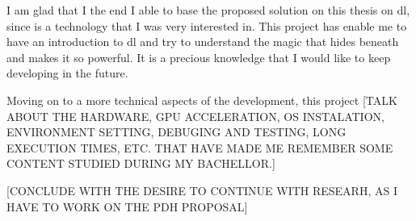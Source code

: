 I am glad that I the end I able to base the proposed solution on this thesis on \acrshort{dl}, since is a technology that I was very interested in. This project has enable me to have an introduction to \acrshort{dl} and try to understand the magic that hides beneath and makes it so powerful. It is a precious knowledge that I would like to keep developing in the future.

Moving on to a more technical aspects of the development, this project [TALK ABOUT THE HARDWARE, GPU ACCELERATION, OS INSTALATION, ENVIRONMENT SETTING, DEBUGING AND TESTING, LONG EXECUTION TIMES, ETC. THAT HAVE MADE ME REMEMBER SOME CONTENT STUDIED DURING MY BACHELLOR.]

[CONCLUDE WITH THE DESIRE TO CONTINUE WITH RESEARH, AS I HAVE TO WORK ON THE PDH PROPOSAL]

\iffalse
However, I have also learnt how difficult it is to find a research field where you feel comfortable with and able to find new research opportunities where you can contribute to. In addition, even though it did not happen to me, I witnessed how a person worked for a couple months and in the end do not achieve the desired results. In fact, this was my main concern during this master’s thesis. I spent around 100 hours manually annotating each organization’s employees’ position inside the company, without being certain if I was going to achieve good enough results or not.
Furthermore, I have also had the chance to delve into artificial intelligence and realize that AI is a field that I would enjoy to keep working on. In addition, I have also had the opportunity to present this research in Databeers Bilbao with a very good acceptance, which I am very pleased about.
All in all, this project has helped me to understand in my own skin, how different research is from my previous experiences, which were more technical. Even though it has been quite a challenge in comparison to what I have been doing until now, ultimately resulted in a rewarding experience, and by being so, I would be thrilled to continue doing research and prove what I am capable of.

\fi